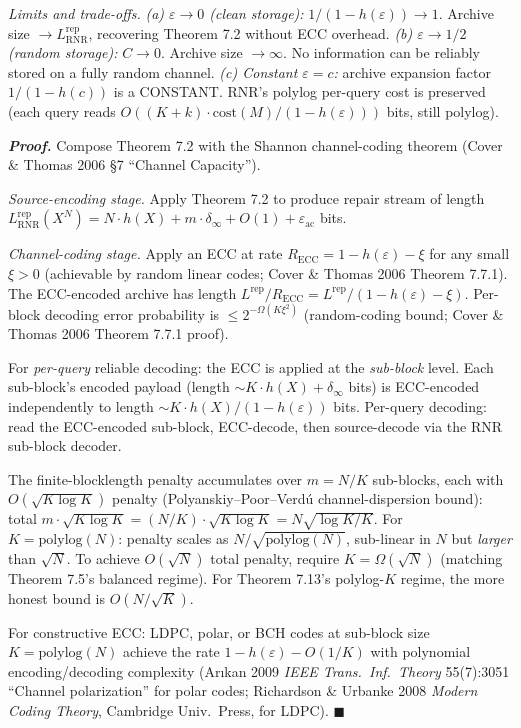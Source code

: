 \documentclass[
]{article}
\begin{document}
\emph{Limits and trade-offs.}
\emph{(a) $\varepsilon \to 0$ (clean storage):} $1/(1 - h(\varepsilon))
\to 1$. Archive size $\to L^{\mathrm{rep}}_{\mathrm{RNR}}$, recovering
Theorem 7.2 without ECC overhead.
\emph{(b) $\varepsilon \to 1/2$ (random storage):} $C \to 0$. Archive
size $\to \infty$. No information can be reliably stored on a fully
random channel.
\emph{(c) Constant $\varepsilon = c$:} archive expansion factor
$1/(1 - h(c))$ is a CONSTANT. RNR's polylog per-query cost is
preserved (each query reads $O((K+k) \cdot \mathrm{cost}(M)/(1-h(\varepsilon)))$
bits, still polylog).

\emph{\textbf{Proof.}} Compose Theorem 7.2 with the Shannon
channel-coding theorem (Cover \& Thomas 2006 §7 ``Channel Capacity'').

\emph{Source-encoding stage.} Apply Theorem 7.2 to produce repair
stream of length $L^{\mathrm{rep}}_{\mathrm{RNR}}(X^N) = N \cdot h(X) +
m \cdot \delta_\infty + O(1) + \varepsilon_{\mathrm{ac}}$ bits.

\emph{Channel-coding stage.} Apply an ECC at rate $R_{\mathrm{ECC}} =
1 - h(\varepsilon) - \xi$ for any small $\xi > 0$ (achievable by random
linear codes; Cover \& Thomas 2006 Theorem 7.7.1). The ECC-encoded
archive has length $L^{\mathrm{rep}}/R_{\mathrm{ECC}} = L^{\mathrm{rep}}/(1
- h(\varepsilon) - \xi)$. Per-block decoding error probability is
$\leq 2^{-\Omega(K \xi^2)}$ (random-coding bound; Cover \& Thomas
2006 Theorem 7.7.1 proof).

For \emph{per-query} reliable decoding: the ECC is applied at the
\emph{sub-block} level. Each sub-block's encoded payload (length
$\sim K \cdot h(X) + \delta_\infty$ bits) is ECC-encoded
independently to length $\sim K \cdot h(X) / (1 - h(\varepsilon))$
bits. Per-query decoding: read the ECC-encoded sub-block,
ECC-decode, then source-decode via the RNR sub-block decoder.

The finite-blocklength penalty accumulates over $m = N/K$ sub-blocks,
each with $O(\sqrt{K \log K})$ penalty (Polyanskiy--Poor--Verd{\'u}
channel-dispersion bound): total
$m \cdot \sqrt{K \log K} = (N/K) \cdot \sqrt{K \log K} = N \sqrt{\log
K / K}$. For $K = \mathrm{polylog}(N)$: penalty scales as $N /
\sqrt{\mathrm{polylog}(N)}$, sub-linear in $N$ but \emph{larger}
than $\sqrt{N}$. To achieve $O(\sqrt{N})$ total penalty, require
$K = \Omega(\sqrt{N})$ (matching Theorem 7.5's balanced regime).
For Theorem 7.13's polylog-$K$ regime, the more honest bound is
$O(N / \sqrt{K})$.

For constructive ECC: LDPC, polar, or BCH codes at sub-block size
$K = \mathrm{polylog}(N)$ achieve the rate $1 - h(\varepsilon) - O(1/K)$
with polynomial encoding/decoding complexity (Arıkan 2009 \emph{IEEE
Trans.\ Inf.\ Theory} 55(7):3051 ``Channel polarization'' for polar
codes; Richardson \& Urbanke 2008 \emph{Modern Coding Theory},
Cambridge Univ.\ Press, for LDPC).
\hfill$\blacksquare$
\end{document}
